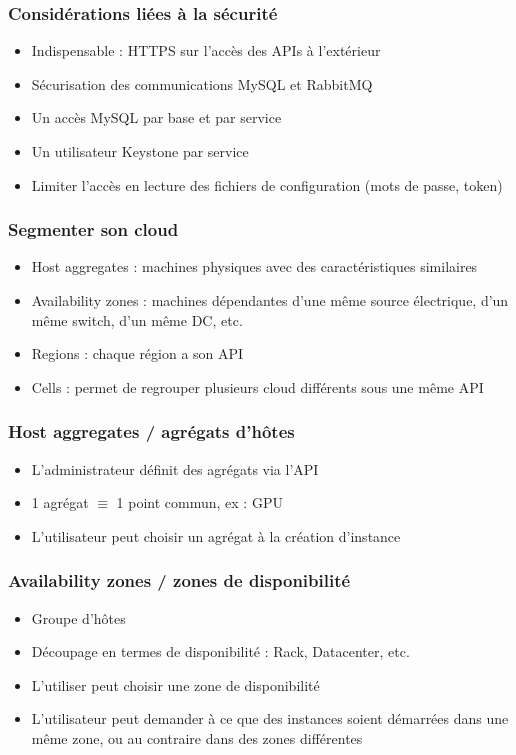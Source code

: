   \begin{frame}
    \frametitle{Considérations liées à la sécurité}
    \begin{itemize}
      \item Indispensable : HTTPS sur l'accès des APIs à l'extérieur
      \item Sécurisation des communications MySQL et RabbitMQ
      \item Un accès MySQL par base et par service
      \item Un utilisateur Keystone par service
      \item Limiter l'accès en lecture des fichiers de configuration (mots de passe, token)
    \end{itemize}
  \end{frame}

  \begin{frame}
    \frametitle{Segmenter son cloud}
    \begin{itemize}
      \item Host aggregates : machines physiques avec des caractéristiques similaires
      \item Availability zones : machines dépendantes d'une même source électrique, d'un même switch, d'un même DC, etc.
      \item Regions : chaque région a son API
      \item Cells : permet de regrouper plusieurs cloud différents sous une même API
    \end{itemize}
  \end{frame}

  \begin{frame}
    \frametitle{Host aggregates / agrégats d'hôtes}
    \begin{itemize}
      \item L'administrateur définit des agrégats via l'API
      \item 1 agrégat $\equiv$ 1 point commun, ex : GPU
      \item L'utilisateur peut choisir un agrégat à la création d'instance
    \end{itemize}
  \end{frame}

  \begin{frame}
    \frametitle{Availability zones / zones de disponibilité}
    \begin{itemize}
      \item Groupe d'hôtes
      \item Découpage en termes de disponibilité : Rack, Datacenter, etc.
      \item L'utiliser peut choisir une zone de disponibilité
      \item L'utilisateur peut demander à ce que des instances soient démarrées dans une même zone, ou au contraire dans des zones différentes
    \end{itemize}
  \end{frame}

